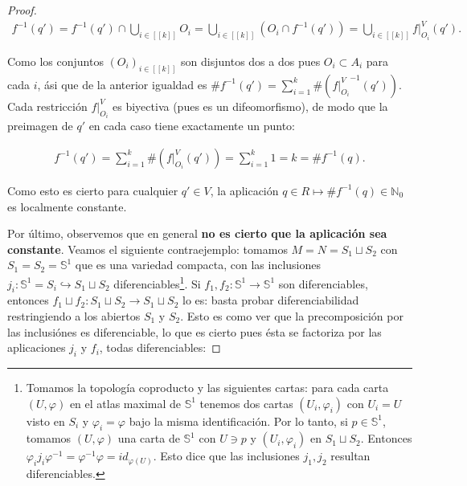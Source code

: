 \documentclass[11pt]{article}
\newcommand{\N}{\mathbb{N}}
\newcommand{\Ss}{\mathbb{S}}
\newcommand{\nat}[1]{[\![#1]\!]}
\begin{document}
\begin{proof}
\begin{align*}
f^{-1}(q') = f^{-1}(q') \cap \bigcup_{i \in \nat{k}}O_i = \bigcup_{i \in \nat{k}}(O_i \cap f^{-1}(q')) = \bigcup_{i \in \nat{k}}f|_{O_i}^V(q').
\end{align*}

Como los conjuntos $(O_i)_{i \in \nat{k}}$ son disjuntos dos a dos pues $O_i \subset A_i$ para cada $i$, \'asi que de la anterior igualdad es $\#f^{-1}(q') = \sum_{i=1}^k\#({f|_{O_i}^V}^{-1}(q'))$. Cada restricci\'on $f|_{O_i}^V$ es biyectiva (pues es un difeomorfismo), de modo que la preimagen de $q'$ en cada caso tiene exactamente un punto:

\begin{align*}
f^{-1}(q') = \sum_{i=1}^k\#(f|_{O_i}^V(q')) = \sum_{i=1}^{k}1 = k = \#f^{-1}(q).
\end{align*}

Como esto es cierto para cualquier $q' \in V$, la aplicaci\'on $q \in R \mapsto \#f^{-1}(q) \in \N_0$ es localmente constante. 

Por \'ultimo, observemos que en general \textbf{no es cierto que la aplicaci\'on sea constante}. Veamos el siguiente contraejemplo: tomamos $M = N = S_1 \sqcup S_2$ con $S_1 = S_2 = \Ss^1$ que es una variedad compacta, con las inclusiones $j_i : \Ss^1 = S_i \hookrightarrow S_1 \sqcup S_2$ diferenciables\footnote{Tomamos la topolog\'ia coproducto y las siguientes cartas: para cada carta $(U,\varphi)$ en el atlas maximal de $\Ss^1$ tenemos dos cartas $(U_i,\varphi_i)$ con $U_i = U$ visto en $S_i$ y $\varphi_i = \varphi$ bajo la misma identificaci\'on. Por lo tanto, si $p \in \Ss^1$, tomamos $(U,\varphi)$ una carta de $\Ss^1$ con $U \ni p$ y $(U_i,\varphi_i)$ en $S_1 \sqcup S_2$. Entonces $\varphi_ij_i\varphi^{-1} = \varphi^{-1}\varphi = id_{\varphi(U)}$. Esto dice que las inclusiones $j_1,j_2$ resultan diferenciables.}. Si $f_1,f_2 : \Ss^1 \to \Ss^1$ son diferenciables, entonces $f_1 \sqcup f_2 : S_1 \sqcup S_2 \to S_1 \sqcup S_2$ lo es: basta probar diferenciabilidad restringiendo a los abiertos $S_1$ y $S_2$. Esto es como ver que la precomposici\'on por las inclusi\'ones es diferenciable, lo que es cierto pues \'esta se factoriza por las aplicaciones $j_i$ y $f_i$, todas diferenciables:


\end{proof}
\end{document}
